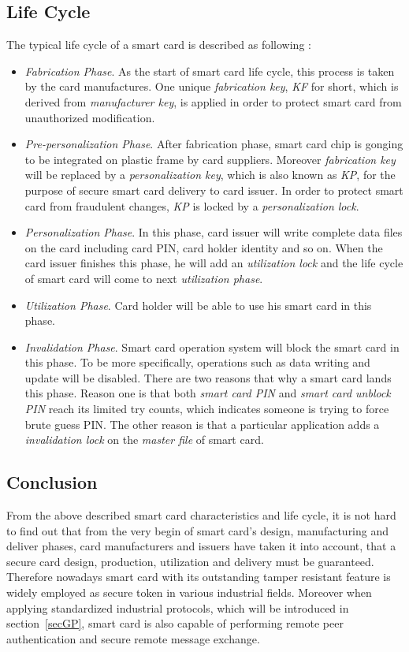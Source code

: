 \subsection{Life Cycle} \label{secLC}
The typical life cycle of a smart card is described as following \cite{smart_card_contactless}:
\begin{itemize}
\item \emph{Fabrication Phase}. As the start of smart card life cycle, this process is taken by the card manufactures. One unique \emph{fabrication key}, \emph{KF} for short, which is derived from \emph{manufacturer key},  is applied in order to protect smart card from unauthorized modification. 
\item \emph{Pre-personalization Phase}. After fabrication phase,  smart card chip is gonging to be integrated on plastic frame by card suppliers. Moreover \emph{fabrication key} will be replaced by a \emph{personalization key}, which is also known as \emph{KP},  for the purpose of secure smart card delivery to card issuer. In order to protect smart card from fraudulent changes, \emph{KP} is locked by a \emph{personalization lock}.
\item \emph{Personalization Phase}. In this phase,  card issuer will write complete data files on the card including card PIN, card holder identity and so on. When the card issuer finishes this phase, he will add an \emph{utilization lock} and the life cycle of smart card will come to next \emph{utilization phase}.
\item \emph{Utilization Phase}. Card holder will be able to use his smart card in this phase. 
\item \emph{Invalidation Phase}. Smart card operation system will block the smart card in this phase. To be more specifically, operations such as data writing and update will be disabled. There are two reasons that why a smart card lands this phase. Reason one is that both \emph{smart card PIN} and \emph{smart card unblock PIN} reach its limited  try counts, which indicates someone is trying to force brute guess PIN.  The other reason is that a particular application adds a \emph{invalidation lock} on the \emph{master file} of smart card.
\end{itemize}

\subsection {Conclusion}
From the above described smart card characteristics and life cycle, it is not hard to find out that from the very begin of smart card's design, manufacturing and deliver phases, card manufacturers and issuers have taken it into account, that a secure card design, production, utilization and delivery must be guaranteed. Therefore nowadays smart card with its outstanding tamper resistant feature is widely employed as secure token in various industrial fields. Moreover when applying standardized industrial protocols, which will be introduced in section~\ref{secGP}, smart card is also capable of performing remote peer authentication and secure remote message exchange.

